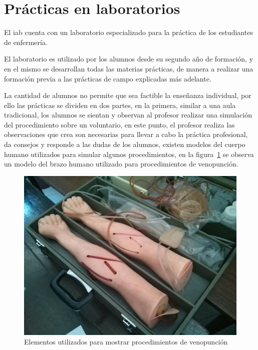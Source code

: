 \section{Prácticas en laboratorios}
\label{sec:practica_lab}

El \Gls{iab} cuenta con un laboratorio especializado para la práctica de los
estudiantes de enfermería.

El laboratorio es utilizado por los alumnos desde su segundo año de formación, y
en el mismo se desarrollan todas las materias prácticas, de manera a realizar
una formación previa a las prácticas de campo explicadas más adelante.

La cantidad de alumnos no permite que sea factible la enseñanza individual, por
ello las prácticas se dividen en dos partes, en la primera, similar a una aula
tradicional, los alumnos se sientan y observan al profesor realizar una
simulación del procedimiento sobre un voluntario, en este punto, el profesor
realiza las observaciones que crea son necesarias para llevar a cabo la práctica
profesional, da consejos y responde a las dudas de los alumnos, existen modelos
del cuerpo humano utilizados para simular algunos procedimientos, en la
figura~\ref{fig:iab_veno} se observa un modelo del brazo humano utilizado para
procedimientos de venopunción.

\begin{figure}[h!t] 
\centering 
\includegraphics[scale=0.2,natwidth=100,natheight=100]{problema/iab_sala_2.jpg}
\caption{Elementos utilizados para mostrar procedimientos de venopunción}
\label{fig:iab_veno}
\end{figure}

